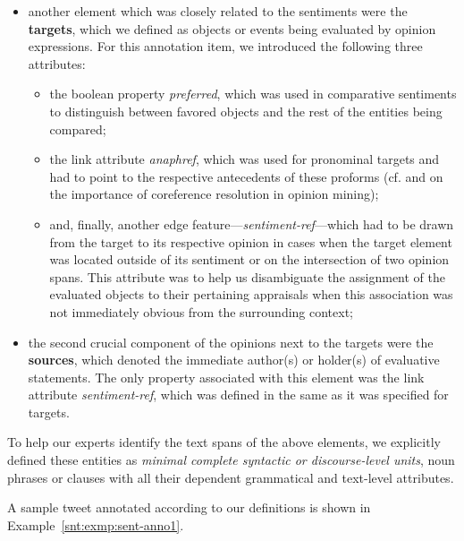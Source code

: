 \begin{itemize}
\item
  another element which was closely related to the sentiments were the
  \textbf{targets}, which we defined as objects or events being
  evaluated by opinion expressions.  For this annotation item, we
  introduced the following three attributes:
  \begin{itemize}
    \item
      the boolean property \emph{preferred}, which was used in
      comparative sentiments to distinguish between favored objects
      and the rest of the entities being compared;
    \item
      the link attribute \emph{anaphref}, which was used for
      pronominal targets and had to point to the respective
      antecedents of these proforms (cf. \citet{Stoyanov:06} and
      \citet{Ding:10} on the importance of coreference resolution in
      opinion mining);
    \item and, finally, another edge
      feature---\emph{sentiment-ref}---which had to be drawn from the
      target to its respective opinion in cases when the target
      element was located outside of its sentiment or on the
      intersection of two opinion spans.  This attribute was to help
      us disambiguate the assignment of the evaluated objects to their
      pertaining appraisals when this association was not immediately
      obvious from the surrounding context;
  \end{itemize}

\item
  the second crucial component of the opinions next to the targets
  were the \textbf{sources}, which denoted the immediate author(s) or
  holder(s) of evaluative statements.  The only property associated
  with this element was the link attribute \emph{sentiment-ref}, which
  was defined in the same as it was specified for targets.
\end{itemize}

To help our experts identify the text spans of the above elements, we
explicitly defined these entities as \emph{minimal complete syntactic
  or discourse-level units}, \ie{} noun phrases or clauses with all
their dependent grammatical and text-level attributes.

A sample tweet annotated according to our definitions is shown in
Example~\ref{snt:exmp:sent-anno1}.

\begin{example}\label{snt:exmp:sent-anno1}
  \upshape{}\\[0.8em]
  \noindent{}
\end{example}

